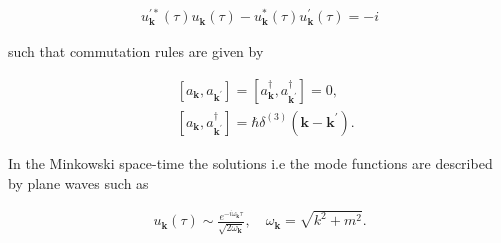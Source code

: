 \begin{align}
    u_{\mathbf{k}}^{\prime *}(\tau) u_{\mathbf{k}}(\tau)-u_{\mathbf{k}}^{*}(\tau) u_{\mathbf{k}}^{\prime}(\tau)= -i
\end{align}

such that commutation rules are given by


\begin{align}
    & {\left[a_{\mathbf{k}}, a_{\mathbf{k}^{\prime}}\right]=\left[a_{\mathbf{k}}^{\dagger}, a_{\mathbf{k}^{\prime}}^{\dagger}\right]=0,} \\
    & {\left[a_{\mathbf{k}}, a_{\mathbf{k}^{\prime}}^{\dagger}\right]=\hbar \delta^{(3)}\left(\mathbf{k}-\mathbf{k}^{\prime}\right) .}
\end{align}

In the Minkowski space-time the solutions i.e the mode functions are described by plane waves such as

\begin{align}
   u_{\mathbf{k}}(\tau) \sim \frac{e^{-i \omega_{\mathbf{k}} \tau}}{\sqrt{2 \omega_{\mathbf{k}}}}, \quad \omega_{\mathbf{k}}=\sqrt{k^{2}+m^{2}} .
 \end{align}


